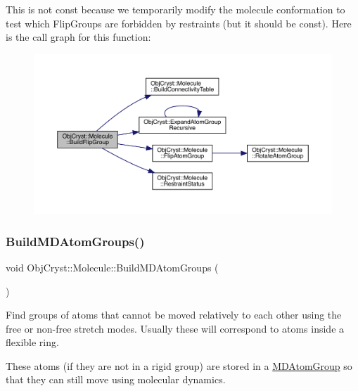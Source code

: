 This is not const because we temporarily modify the molecule conformation to test which Flip\+Groups are forbidden by restraints (but it should be const). Here is the call graph for this function\+:
\nopagebreak
\begin{figure}[H]
\begin{center}
\leavevmode
\includegraphics[width=350pt]{class_obj_cryst_1_1_molecule_aca2ed46d26209807d587722d131c6315_cgraph}
\end{center}
\end{figure}
\mbox{\label{class_obj_cryst_1_1_molecule_a0944a68727d85bee4ec0cce453cb451c}} 
\subsubsection{\texorpdfstring{BuildMDAtomGroups()}{BuildMDAtomGroups()}}
{\footnotesize\ttfamily void Obj\+Cryst\+::\+Molecule\+::\+Build\+M\+D\+Atom\+Groups (\begin{DoxyParamCaption}{ }\end{DoxyParamCaption})}

Find groups of atoms that cannot be moved relatively to each other using the free or non-\/free stretch modes. Usually these will correspond to atoms inside a flexible ring.

These atoms (if they are not in a rigid group) are stored in a \mbox{\hyperlink{struct_obj_cryst_1_1_m_d_atom_group}{M\+D\+Atom\+Group}} so that they can still move using molecular dynamics.

